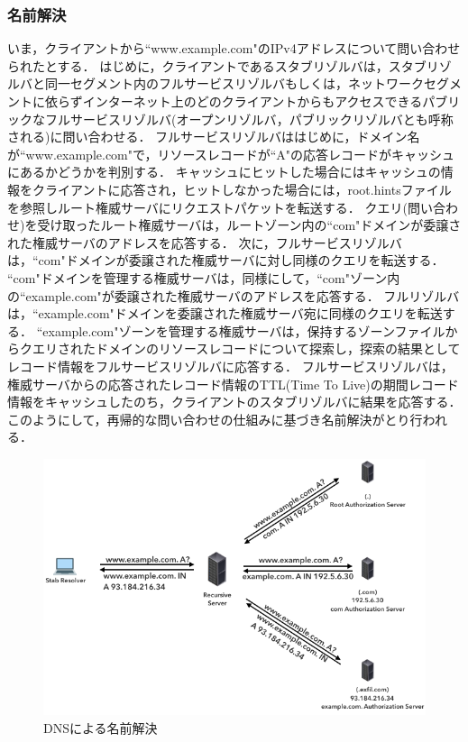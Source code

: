 
\subsubsection{名前解決}
いま，クライアントから``www.example.com"のIPv4アドレスについて問い合わせられたとする．
はじめに，クライアントであるスタブリゾルバは，スタブリゾルバと同一セグメント内のフルサービスリゾルバもしくは，ネットワークセグメントに依らずインターネット上のどのクライアントからもアクセスできるパブリックなフルサービスリゾルバ(オープンリゾルバ，パブリックリゾルバとも呼称される)に問い合わせる．
フルサービスリゾルバははじめに，ドメイン名が``www.example.com"で，リソースレコードが``A"の応答レコードがキャッシュにあるかどうかを判別する．
キャッシュにヒットした場合にはキャッシュの情報をクライアントに応答され，ヒットしなかった場合には，root.hintsファイルを参照しルート権威サーバにリクエストパケットを転送する．
クエリ(問い合わせ)を受け取ったルート権威サーバは，ルートゾーン内の``com"ドメインが委譲された権威サーバのアドレスを応答する．
次に，フルサービスリゾルバは，``com"ドメインが委譲された権威サーバに対し同様のクエリを転送する．
``com"ドメインを管理する権威サーバは，同様にして，``com"ゾーン内の``example.com"が委譲された権威サーバのアドレスを応答する．
フルリゾルバは，``example.com"ドメインを委譲された権威サーバ宛に同様のクエリを転送する．
``example.com"ゾーンを管理する権威サーバは，保持するゾーンファイルからクエリされたドメインのリソースレコードについて探索し，探索の結果としてレコード情報をフルサービスリゾルバに応答する．
フルサービスリゾルバは，権威サーバからの応答されたレコード情報のTTL(Time To Live)の期間レコード情報をキャッシュしたのち，クライアントのスタブリゾルバに結果を応答する．
このようにして，再帰的な問い合わせの仕組みに基づき名前解決がとり行われる．

\newpage
\begin{figure}[h]
 \centering
 \includegraphics[width=12.0cm]{figure/dns-name-resolution.png}
 \caption{DNSによる名前解決}
 \label{fig:dns-name-resolution}
\end{figure}

